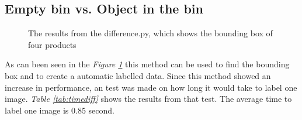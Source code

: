 \clearpage
\subsection{Empty bin vs. Object in the bin}
\begin{figure}[h]
    \centering
    \hfill
    \hfill
    \hfill
    \caption{The results from the difference.py, which shows the bounding box of four products}
    \label{figure: labelling}
\end{figure}
As can been seen in the \textit{Figure \ref{figure: labelling}} this method can be used to find the bounding box and to create a automatic labelled data.  
Since this method showed an increase in performance, an test was made on how long it would take to label one image. 
\textit{Table \ref{tab:timediff}} shows the results from that test. The average time to label one image is 0.85 second.



